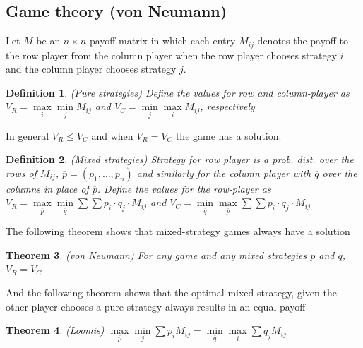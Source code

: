 \documentclass[12pt]{article}
\newtheorem{thm}{Theorem}[section]
\newtheorem{dfn}[thm]{Definition}
\begin{document}
\subsection*{Game theory (von Neumann)}
Let $M$ be an $n \times n$ payoff-matrix in which each entry $M_{ij}$ denotes the payoff to the row player from the column player when the row player chooses strategy $i$ and the column player chooses strategy $j$.
\\
\begin{dfn}
(Pure strategies) Define the values for row and column-player as $V_R = \max\limits_{i} \min\limits_{j} M_{ij}$ and $V_C = \min\limits_{j} \max\limits_{i} M_{ij}$, respectively
\end{dfn}

In general $V_R \leq V_C$ and when $V_R=V_C$ the game has a solution.
\\
\begin{dfn}
(Mixed strategies) Strategy for row player is a prob. dist. over the rows of $M_{ij}$, $\overline{p}=\left( p_1, \hdots, p_n \right)$ and similarly for the column player with $\overline{q}$ over the columns in place of $\overline{p}$. Define the values for the row-player as $V_R = \max\limits_{\overline{p}} \min\limits_{\overline{q}} \sum \sum p_i \cdot q_j \cdot M_{ij}$ and $V_C = \min\limits_{\overline{q}} \max\limits_{\overline{p}} \sum \sum p_i \cdot q_j \cdot M_{ij}$
\end{dfn}
The following theorem shows that mixed-strategy games always have a solution \\
\begin{thm}
(von Neumann) For any game and any mixed strategies $\overline{p}$ and $\overline{q}$, $V_R = V_C$
\end{thm}
And the following theorem shows that the optimal mixed strategy, given the other player chooses a pure strategy always results in an equal payoff \\
\begin{thm}
(Loomis) $\max\limits_{\overline{p}} \min\limits_j \sum p_i M_{ij} = \min\limits_{\overline{q}} \max\limits_i \sum q_j M_{ij} $
\end{thm}
\end{document}
